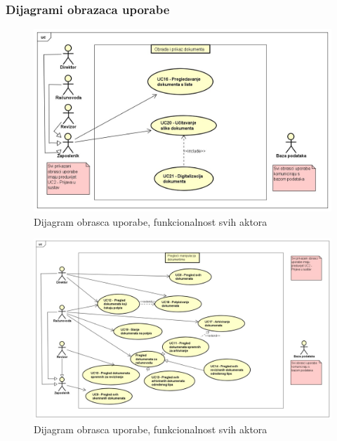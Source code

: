 				\clearpage
					
				\subsubsection{Dijagrami obrazaca uporabe}
					
					\begin{figure}[H]
						\includegraphics[width=\textwidth]{slike/3.1.1 dijagrami/ObradaIPrikazDokumenata.PNG}
						\caption{Dijagram obrasca uporabe, funkcionalnost svih aktora}
						\label{Obrazac1} 
					\end{figure}
					
					\begin{figure}[H]
						\includegraphics[width=\textwidth]{slike/3.1.1 dijagrami/PregledManipulacijaDokumentima.PNG}
						\caption{Dijagram obrasca uporabe, funkcionalnost svih aktora}
						\label{Obrazac2} 
					\end{figure}
					
